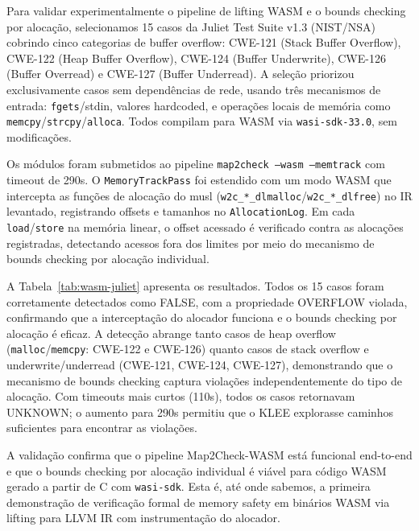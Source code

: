 \documentclass[12pt]{article}
\newcommand{\WasmCases}{15}
\newcommand{\WasmTimeout}{290}
\begin{document}
Para validar experimentalmente o pipeline de lifting WASM e o bounds checking por alocação, selecionamos \WasmCases{} casos da Juliet Test Suite v1.3 (NIST/NSA)~\cite{nsa2017juliet} cobrindo cinco categorias de buffer overflow: CWE-121 (Stack Buffer Overflow), CWE-122 (Heap Buffer Overflow), CWE-124 (Buffer Underwrite), CWE-126 (Buffer Overread) e CWE-127 (Buffer Underread). A seleção priorizou exclusivamente casos sem dependências de rede, usando três mecanismos de entrada: \texttt{fgets}/stdin, valores hardcoded, e operações locais de memória como \texttt{memcpy}/\texttt{strcpy}/\texttt{alloca}. Todos compilam para WASM via \texttt{wasi-sdk-33.0}, sem modificações.

Os módulos foram submetidos ao pipeline \texttt{map2check --wasm --memtrack} com timeout de \WasmTimeout{}s. O \texttt{MemoryTrackPass} foi estendido com um modo WASM que intercepta as funções de alocação do musl (\texttt{w2c\_*\_dlmalloc}/\texttt{w2c\_*\_dlfree}) no IR levantado, registrando offsets e tamanhos no \texttt{AllocationLog}. Em cada \texttt{load}/\texttt{store} na memória linear, o offset acessado é verificado contra as alocações registradas, detectando acessos fora dos limites por meio do mecanismo de bounds checking por alocação individual.

A Tabela~\ref{tab:wasm-juliet} apresenta os resultados. Todos os \WasmCases{} casos foram corretamente detectados como FALSE, com a propriedade OVERFLOW violada, confirmando que a interceptação do alocador funciona e o bounds checking por alocação é eficaz. A detecção abrange tanto casos de heap overflow (\texttt{malloc}/\texttt{memcpy}: CWE-122 e CWE-126) quanto casos de stack overflow e underwrite/underread (CWE-121, CWE-124, CWE-127), demonstrando que o mecanismo de bounds checking captura violações independentemente do tipo de alocação. Com timeouts mais curtos (110s), todos os casos retornavam UNKNOWN; o aumento para \WasmTimeout{}s permitiu que o KLEE explorasse caminhos suficientes para encontrar as violações.

A validação confirma que o pipeline Map2Check-WASM está funcional end-to-end e que o bounds checking por alocação individual é viável para código WASM gerado a partir de C com \texttt{wasi-sdk}. Esta é, até onde sabemos, a primeira demonstração de verificação formal de memory safety em binários WASM via lifting para LLVM IR com instrumentação do alocador.
\end{document}
